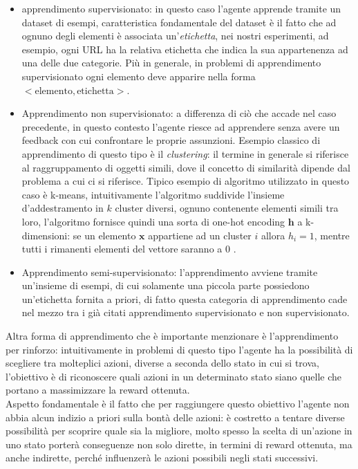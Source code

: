 \documentclass[../../main.tex]{subfiles}
\begin{document}
    \begin{itemize}
        \item apprendimento supervisionato: in questo caso l'agente apprende tramite un dataset di esempi, caratteristica fondamentale del dataset è il fatto che ad ognuno degli elementi è associata un'\textit{etichetta}, nei nostri esperimenti, ad esempio, ogni URL ha la relativa etichetta che indica la sua appartenenza ad  una delle due categorie. Più in generale, in problemi di apprendimento supervisionato ogni elemento deve apparire nella forma $ <\text{elemento}, \text{etichetta}> $.
        \item Apprendimento non supervisionato: a differenza di ciò che accade nel caso precedente, in questo contesto l'agente riesce ad apprendere senza avere un feedback con cui confrontare le proprie assunzioni. Esempio classico di apprendimento di questo tipo è il \textit{clustering}: il termine in generale si riferisce al raggruppamento di oggetti simili, dove il concetto di similarità dipende dal problema a cui ci si riferisce. Tipico esempio di algoritmo utilizzato in questo caso è k-means, intuitivamente l'algoritmo suddivide  l'insieme d'addestramento in $k$ cluster diversi, ognuno contenente elementi simili tra loro, l'algoritmo fornisce quindi una sorta di one-hot encoding $\boldsymbol{h}$ a k-dimensioni: se un elemento $\boldsymbol{x}$ appartiene ad un cluster $i$ allora $h_i = 1$, mentre tutti i rimanenti elementi del vettore saranno a 0 \cite{goodfellow2016deep}.
        \item Apprendimento semi-supervisionato: l'apprendimento avviene tramite un'insieme di esempi, di cui solamente una piccola parte possiedono un'etichetta fornita a priori, di fatto questa categoria di apprendimento cade nel mezzo tra i già citati apprendimento supervisionato e non supervisionato.
    \end{itemize}

    Altra forma di apprendimento che è importante menzionare è l'apprendimento per rinforzo: intuitivamente in problemi di questo tipo l'agente ha la possibilità di scegliere tra molteplici azioni, diverse a seconda dello stato in cui si trova, l'obiettivo è di riconoscere quali azioni in un determinato stato siano quelle che portano a massimizzare la reward ottenuta.\\
    Aspetto fondamentale è il fatto che per raggiungere questo obiettivo l'agente non abbia alcun indizio a priori sulla bontà delle azioni: è costretto a tentare diverse possibilità per scoprire quale sia la migliore, molto spesso la scelta di un'azione in uno stato porterà conseguenze non solo dirette, in termini di reward ottenuta, ma anche indirette, perché influenzerà le azioni possibili negli stati successivi.
\end{document}
